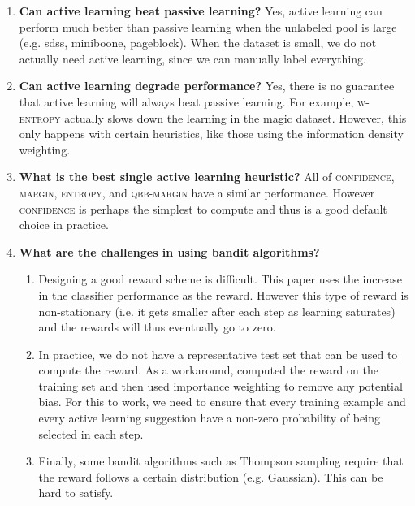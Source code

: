 \documentclass[fleqn,10pt,lineno]{wlpeerj} %
\begin{document}
\begin{enumerate}
	\item \textbf{Can active learning beat passive learning?} Yes, active
	learning can perform much better than passive learning when the unlabeled
	pool is large (e.g. sdss, miniboone, pageblock). When the dataset is small,
	we do not actually need active learning, since we can manually label
	everything.

	\item \textbf{Can active learning degrade performance?} Yes, there is no
	guarantee that active learning will always beat passive learning. For
	example, \textsc{w-entropy} actually slows down the learning in the magic
	dataset. However, this only happens with certain heuristics, like those
	using the information density weighting.

	\item \textbf{What is the best single active learning heuristic?} All of
	\textsc{confidence}, \textsc{margin}, \textsc{entropy}, and
	\textsc{qbb-margin} have a similar performance. However \textsc{confidence}
	is perhaps the simplest to compute and thus is a good default choice in
	practice.

	\item \textbf{What are the challenges in using bandit algorithms?}
	\begin{enumerate}
		\item Designing a good reward scheme is difficult. This paper uses the
		increase in the classifier performance as the reward. However this type
		of reward is non-stationary (i.e. it gets smaller after each step as
		learning saturates) and the rewards will thus eventually go to zero.
		\item In practice, we do not have a representative test set that can be
		used to compute the reward. As a workaround, \cite{hsu15} computed the
		reward on the training set and then used importance weighting to remove
		any potential bias. For this to work, we need to ensure that every
		training example and every active learning suggestion have a non-zero
		probability of being selected in each step.
		\item Finally, some bandit algorithms such as Thompson sampling
		require that the reward follows a certain distribution (e.g. Gaussian).
		This can be hard to satisfy.
	\end{enumerate}


\end{enumerate}
\end{document}
